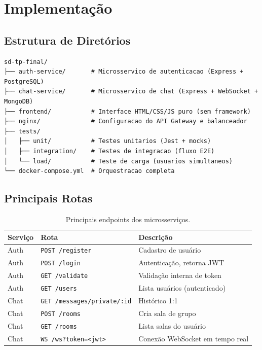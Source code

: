 \documentclass[12pt,a4paper]{article}
\begin{document}
\section{Implementação}

\subsection{Estrutura de Diretórios}

\begin{lstlisting}
sd-tp-final/
├── auth-service/       # Microsservico de autenticacao (Express + PostgreSQL)
├── chat-service/       # Microsservico de chat (Express + WebSocket + MongoDB)
├── frontend/           # Interface HTML/CSS/JS puro (sem framework)
├── nginx/              # Configuracao do API Gateway e balanceador
├── tests/
│   ├── unit/           # Testes unitarios (Jest + mocks)
│   ├── integration/    # Testes de integracao (fluxo E2E)
│   └── load/           # Teste de carga (usuarios simultaneos)
└── docker-compose.yml  # Orquestracao completa
\end{lstlisting}

\subsection{Principais Rotas}

\begin{table}[H]
\centering
\footnotesize
\begin{tabularx}{\textwidth}{llX}
\toprule
\textbf{Serviço} & \textbf{Rota} & \textbf{Descrição} \\
\midrule
Auth  & \texttt{POST /register}                    & Cadastro de usuário \\
Auth  & \texttt{POST /login}                       & Autenticação, retorna JWT \\
Auth  & \texttt{GET /validate}                     & Validação interna de token \\
Auth  & \texttt{GET /users}                        & Lista usuários (autenticado) \\
Chat  & \texttt{GET /messages/private/:id}         & Histórico 1:1 \\
Chat  & \texttt{POST /rooms}                       & Cria sala de grupo \\
Chat  & \texttt{GET /rooms}                        & Lista salas do usuário \\
Chat  & \texttt{WS /ws?token=<jwt>}                & Conexão WebSocket em tempo real \\
\bottomrule
\end{tabularx}
\caption{Principais endpoints dos microsserviços.}
\end{table}
\end{document}
